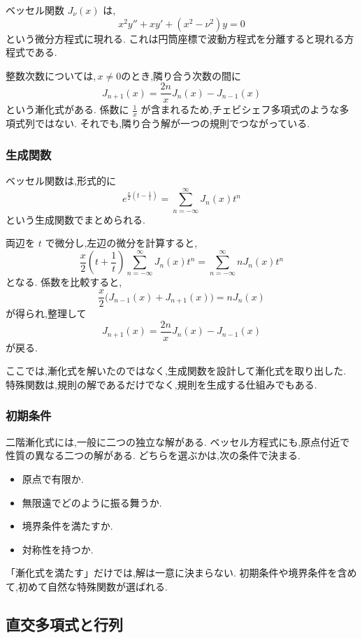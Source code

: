 ベッセル関数 $J_\nu(x)$ は,
\[
  x^2y''+xy'+(x^2-\nu^2)y=0
\]
という微分方程式に現れる.
これは円筒座標で波動方程式を分離すると現れる方程式である.

整数次数については,\,$x\ne0$のとき,隣り合う次数の間に
\[
  J_{n+1}(x)
  =\frac{2n}{x}J_n(x)-J_{n-1}(x)
\]
という漸化式がある.
係数に $\frac{1}{x}$ が含まれるため,チェビシェフ多項式のような多項式列ではない.
それでも,隣り合う解が一つの規則でつながっている.

\subsubsection{生成関数}

ベッセル関数は,形式的に
\[
  e^{\frac{x}{2}\left(t-\frac1t\right)}
  =\sum_{n=-\infty}^{\infty}J_n(x)t^n
\]
という生成関数でまとめられる.

両辺を $t$ で微分し,左辺の微分を計算すると,
\[
  \frac{x}{2}\left(t+\frac1t\right)
  \sum_{n=-\infty}^{\infty}J_n(x)t^n
  =
  \sum_{n=-\infty}^{\infty}nJ_n(x)t^n
\]
となる.
係数を比較すると,
\[
  \frac{x}{2}\bigl(J_{n-1}(x)+J_{n+1}(x)\bigr)
  =nJ_n(x)
\]
が得られ,整理して
\[
  J_{n+1}(x)=\frac{2n}{x}J_n(x)-J_{n-1}(x)
\]
が戻る.

ここでは,漸化式を解いたのではなく,生成関数を設計して漸化式を取り出した.
特殊関数は,規則の解であるだけでなく,規則を生成する仕組みでもある.

\subsubsection{初期条件}

二階漸化式には,一般に二つの独立な解がある.
ベッセル方程式にも,原点付近で性質の異なる二つの解がある.
どちらを選ぶかは,次の条件で決まる.

\begin{itemize}
  \item 原点で有限か.
  \item 無限遠でどのように振る舞うか.
  \item 境界条件を満たすか.
  \item 対称性を持つか.
\end{itemize}

「漸化式を満たす」だけでは,解は一意に決まらない.
初期条件や境界条件を含めて,初めて自然な特殊関数が選ばれる.

\subsection{直交多項式と行列}

